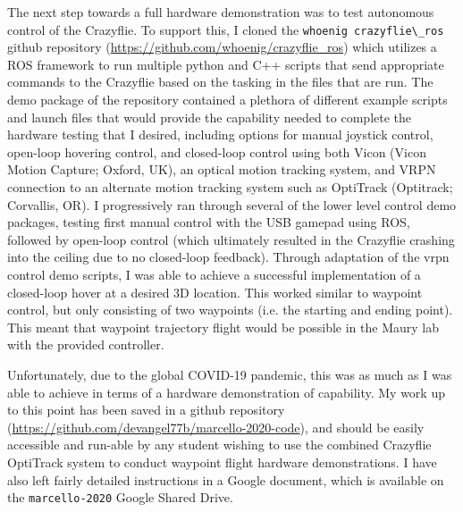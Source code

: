 The next step towards a full hardware demonstration was to test autonomous control of the Crazyflie. To support this, I cloned the \lstinline{whoenig crazyflie\_ros} github repository (\url{https://github.com/whoenig/crazyflie_ros}) which utilizes a ROS framework to run multiple python and C++ scripts that send appropriate commands to the Crazyflie based on the tasking in the files that are run. The demo package of the repository contained a plethora of different example scripts and launch files that would provide the capability needed to complete the hardware testing that I desired, including options for manual joystick control, open-loop hovering control, and closed-loop control using both Vicon (Vicon Motion Capture; Oxford, UK), an optical motion tracking system, and VRPN connection to an alternate motion tracking system such as OptiTrack (Optitrack; Corvallis, OR). I progressively ran through several of the lower level control demo packages, testing first manual control with the USB gamepad using ROS, followed by open-loop control (which ultimately resulted in the Crazyflie crashing into the ceiling due to no closed-loop feedback). Through adaptation of the vrpn control demo scripts, I was able to achieve a successful implementation of a closed-loop hover at a desired 3D location. This worked similar to waypoint control, but only consisting of two waypoints (i.e. the starting and ending point). This meant that waypoint trajectory flight would be possible in the Maury lab with the provided controller. 

Unfortunately, due to the global COVID-19 pandemic, this was as much as I was able to achieve in terms of a hardware demonstration of capability. My work up to this point has been saved in a github repository (\url{https://github.com/devangel77b/marcello-2020-code}), and should be easily accessible and run-able by any student wishing to use the combined Crazyflie OptiTrack system to conduct waypoint flight hardware demonstrations. I have also left fairly detailed instructions in a Google document, which is available on the \lstinline{marcello-2020} Google Shared Drive.

